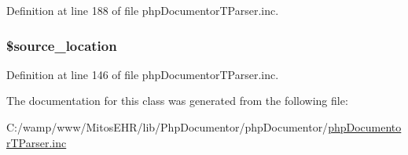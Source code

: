 \-Definition at line 188 of file php\-Documentor\-T\-Parser.\-inc.

\hypertarget{classphp_documentor_t_parser_a887cb4f9bd3322f15c4c9edfa1c85796}{
\subsubsection[{\$source\-\_\-location}]{\setlength{\rightskip}{0pt plus 5cm}\$source\-\_\-location}}\label{classphp_documentor_t_parser_a887cb4f9bd3322f15c4c9edfa1c85796}


\-Definition at line 146 of file php\-Documentor\-T\-Parser.\-inc.



\-The documentation for this class was generated from the following file\-:\begin{DoxyCompactItemize}
\item 
\-C\-:/wamp/www/\-Mitos\-E\-H\-R/lib/\-Php\-Documentor/php\-Documentor/\hyperlink{php_documentor_t_parser_8inc}{php\-Documentor\-T\-Parser.\-inc}\end{DoxyCompactItemize}
